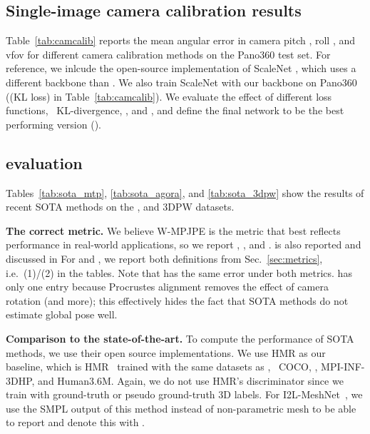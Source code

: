\documentclass[10pt,twocolumn,letterpaper,usenames,dvipsnames]{article}
\begin{document}
\subsection{Single-image camera calibration results}
Table~\ref{tab:camcalib} reports the mean angular error in camera pitch , roll , and vfov  for different camera calibration methods on the Pano360 test set.
For reference, we inlcude the open-source implementation of ScaleNet \cite{zhu2020single}, which uses a different backbone than \camcalib.
We also train ScaleNet with our backbone on Pano360 (\camcalib (KL loss) in Table~\ref{tab:camcalib}).
We evaluate the effect of different loss functions, \ie~KL-divergence, \softltwo, and \softbiasedltwo, and define the final \camcalib network to be the best performing version (\softbiasedltwo).








\subsection{\methodname evaluation}
Tables~\ref{tab:sota_mtp}, \ref{tab:sota_agora}, and \ref{tab:sota_3dpw} show the results of recent SOTA methods on the \mtpcam, \agoracam and 3DPW datasets. 

{\bf The correct metric.} 
We believe W-MPJPE is the metric that best reflects performance in real-world applications, so we report \wmpjpe, \pampjpe, and \wpve. \mpjpe is also reported and discussed in \supmat
For \wmpjpe and \wpve, we report both definitions from Sec.~\ref{sec:metrics}, i.e.~(1)/(2) in the tables.
Note that \methodname has the same error under both metrics.
\pampjpe has only one entry because Procrustes alignment removes the effect of camera rotation (and more); this effectively hides the fact that SOTA methods do not estimate global pose well.

{\bf Comparison to the state-of-the-art.} 
To compute the performance of SOTA methods, we use their open source implementations. 
We use HMR as our \iwcam baseline, 
which is HMR~\cite{kanazawa_hmr} trained with the same datasets as \methodname, \ie~COCO, \agoracam, MPI-INF-3DHP, and Human3.6M. 
Again, we do not use HMR's discriminator since we train with ground-truth or pseudo ground-truth 3D labels. For I2L-MeshNet~\cite{Moon_2020_ECCV_I2L-MeshNet}, we use the SMPL output of this method instead of non-parametric mesh to be able to report \wpve and denote this with .
\end{document}
